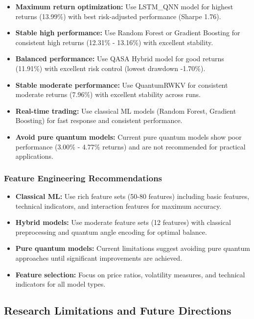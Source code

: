 \documentclass[12pt,a4paper]{article}
\begin{document}
\begin{itemize}
    \item \textbf{Maximum return optimization:} Use LSTM\_QNN model for highest returns (13.99\%) with best risk-adjusted performance (Sharpe 1.76).
    \item \textbf{Stable high performance:} Use Random Forest or Gradient Boosting for consistent high returns (12.31\% - 13.16\%) with excellent stability.
    \item \textbf{Balanced performance:} Use QASA Hybrid model for good returns (11.91\%) with excellent risk control (lowest drawdown -1.70\%).
    \item \textbf{Stable moderate performance:} Use QuantumRWKV for consistent moderate returns (7.96\%) with excellent stability across runs.
    \item \textbf{Real-time trading:} Use classical ML models (Random Forest, Gradient Boosting) for fast response and consistent performance.
    \item \textbf{Avoid pure quantum models:} Current pure quantum models show poor performance (3.00\% - 4.77\% returns) and are not recommended for practical applications.
\end{itemize}

\subsubsection{Feature Engineering Recommendations}

\begin{itemize}
    \item \textbf{Classical ML:} Use rich feature sets (50-80 features) including basic features, technical indicators, and interaction features for maximum accuracy.
    \item \textbf{Hybrid models:} Use moderate feature sets (12 features) with classical preprocessing and quantum angle encoding for optimal balance.
    \item \textbf{Pure quantum models:} Current limitations suggest avoiding pure quantum approaches until significant improvements are achieved.
    \item \textbf{Feature selection:} Focus on price ratios, volatility measures, and technical indicators for all model types.
\end{itemize}

\subsection{Research Limitations and Future Directions}
\end{document}
